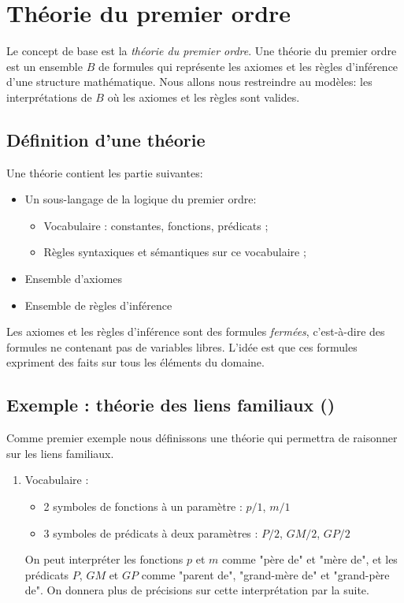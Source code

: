 {\section{Théorie du premier ordre}

Le concept de base est la {\em théorie du premier ordre}.
Une théorie du premier ordre est un ensemble $B$ de formules
qui représente les axiomes et les règles d'inférence d'une structure mathématique.
Nous allons nous restreindre au modèles: les interprétations de $B$
où les axiomes et les règles sont valides.

\subsection{Définition d'une théorie}

Une théorie contient les partie suivantes:
\begin{itemize}
\item Un sous-langage de la logique du premier ordre:
\begin{itemize}
\item Vocabulaire : constantes, fonctions, prédicats ;
\item Règles syntaxiques et sémantiques sur ce vocabulaire ;
\end{itemize}
\item Ensemble d'axiomes
\item Ensemble de règles d'inférence
\end{itemize}
Les axiomes et les règles d'inférence sont des
formules {\em fermées}, c'est-à-dire des formules ne contenant pas de variables libres.
L'idée est que ces formules expriment des faits sur tous les éléments du domaine.

\subsection{Exemple : théorie des liens familiaux ()}

Comme premier exemple
nous définissons une théorie qui permettra de raisonner sur les liens familiaux.

\begin{enumerate}
\item Vocabulaire : 
\begin{itemize}
\item 2 symboles de fonctions à un paramètre : $p/1$, $m/1$
\item 3 symboles de prédicats à deux paramètres : $P/2$, $GM/2$, $GP/2$\\
\end{itemize}
On peut interpréter les fonctions $p$ et $m$ comme "père de" et "mère de", et les prédicats $P$, $GM$ et $GP$ comme "parent de", "grand-mère de" et "grand-père de". On donnera plus de précisions sur cette interprétation par la suite.\\


\end{enumerate}}
